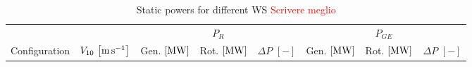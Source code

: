 \documentclass[11pt, a4paper]{article}
\begin{document}
\begin{table}
  \caption{Static powers for different WS \textcolor{red}{Scrivere meglio}}
  \begin{tabular}{cc|ccc|ccc}
    \toprule
    & & \multicolumn{3}{c|}{$P_R$} & \multicolumn{3}{c}{$P_{GE}$} \\
    Configuration & $V_{10} \, \left[\si{\meter\per\second}\right]$ & Gen. $\left[\si{\mega\watt}\right]$ & Rot. $\left[\si{\mega\watt}\right]$ & $\Delta P$ $\left[-\right]$  & Gen. $\left[\si{\mega\watt}\right]$ & Rot. $\left[\si{\mega\watt}\right]$ & $\Delta P$ $\left[-\right]$\\ \midrule
     
     
  \end{tabular}
\end{table}
\end{document}
